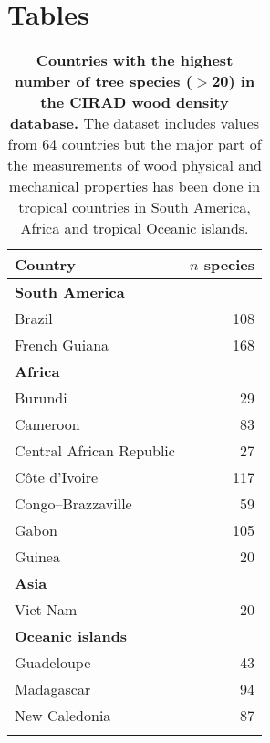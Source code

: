 \documentclass[a4paper, 12pt, leqno, dvipsnames]{article}\usepackage[]{graphicx}\usepackage[]{color}
\begin{document}
\section*{Tables}





\vfill
  \begin{longtable}{@{}lr@{}} 
    \caption{\textbf{Countries with the highest number of tree species ($>$20) in the
      CIRAD wood density database.} The dataset includes values from 64 countries but the major
    part of the measurements of wood physical and mechanical properties has been done in tropical
    countries in South America, Africa and tropical Oceanic islands.}\label{tab:Countries}\\
    \toprule
    Country & $n$ species \\
    \midrule
    \textbf{South America} & ~ \\ 
    Brazil & 108 \\
    French Guiana & 168 \\
    \textbf{Africa} & ~ \\
    Burundi & 29 \\
    Cameroon & 83 \\
    Central African Republic & 27 \\
    Côte d'Ivoire & 117 \\
    Congo--Brazzaville & 59 \\
    Gabon & 105 \\
    Guinea & 20 \\
    \textbf{Asia} & ~ \\
    Viet Nam & 20 \\
    \textbf{Oceanic islands} & ~ \\
    Guadeloupe & 43 \\
    Madagascar & 94 \\
    New Caledonia & 87 \\
    \bottomrule\\
  \end{longtable}
\vfill
\end{document}
